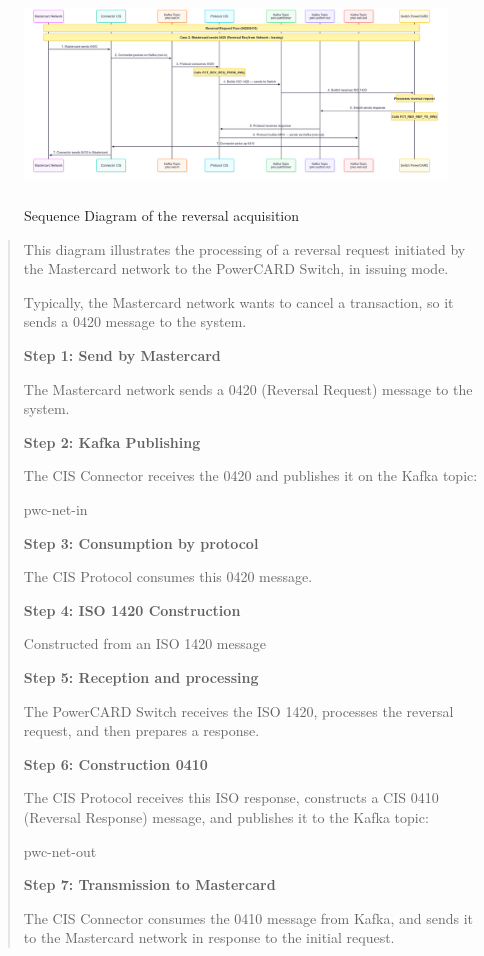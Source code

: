 \documentclass[12pt,a4paper]{report}
\begin{document}
\begin{figure}[H]
\centering
\includegraphics[width=6.95813in,height=2.23377in]{media/image40.png}
\caption{Sequence Diagram of the reversal acquisition}
\label{fig:SDRA}
\end{figure}
\begin{quote}
This diagram illustrates the processing of a reversal request initiated
by the Mastercard network to the PowerCARD Switch, in issuing mode.

Typically, the Mastercard network wants to cancel a transaction, so it
sends a 0420 message to the system.

\textbf{Step 1: Send by Mastercard}

The Mastercard network sends a 0420 (Reversal Request) message to the
system.

\textbf{Step 2: Kafka Publishing}

The CIS Connector receives the 0420 and publishes it on the Kafka topic:

pwc-net-in

\textbf{Step 3: Consumption by protocol}

The CIS Protocol consumes this 0420 message.

\textbf{Step 4: ISO 1420 Construction}

Constructed from an ISO 1420 message

\textbf{Step 5: Reception and processing}

The PowerCARD Switch receives the ISO 1420, processes the reversal
request, and then prepares a response.

\textbf{Step 6: Construction 0410}

The CIS Protocol receives this ISO response, constructs a CIS 0410
(Reversal Response) message, and publishes it to the Kafka topic:

pwc-net-out

\textbf{Step 7: Transmission to Mastercard}

The CIS Connector consumes the 0410 message from Kafka, and sends it to
the Mastercard network in response to the initial request.
\end{quote}
\end{document}
